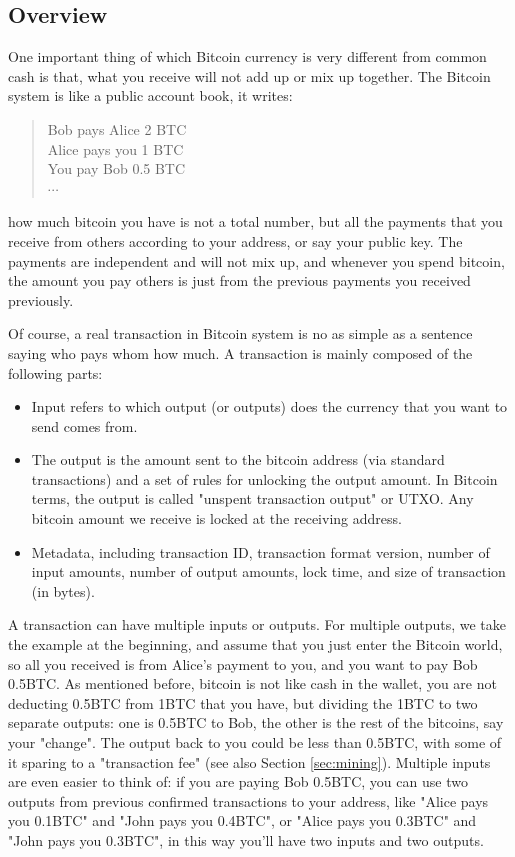 \documentclass[12pt,a4paper]{article}
\begin{document}
\subsection{Overview}
One important thing of which Bitcoin currency is very different from common cash is that, what you receive will not add up or mix up together. The Bitcoin system is like a public account book, it writes:
\begin{quote}
Bob pays Alice 2 BTC \\
Alice pays you 1 BTC\\
You pay Bob 0.5 BTC\\
$\cdots$
\end{quote}
how much bitcoin you have is not a total number, but all the payments that you receive from others according to your address, or say your public key. The payments are independent and will not mix up, and whenever you spend bitcoin, the amount you pay others is just from the previous payments you received previously. 

Of course, a real transaction in Bitcoin system is no as simple as a sentence saying who pays whom how much. A transaction is mainly composed of the following parts:
\begin{itemize}
	\item Input refers to which output (or outputs) does the currency that you want to send comes from.
	\item The output is the amount sent to the bitcoin address (via standard transactions) and a set of rules for unlocking the output amount. In Bitcoin terms, the output is called "unspent transaction output" or UTXO. Any bitcoin amount we receive is locked at the receiving address.
	\item Metadata, including transaction ID, transaction format version, number of input amounts, number of output amounts, lock time, and size of transaction (in bytes).
\end{itemize}

A transaction can have multiple inputs or outputs. For multiple outputs, we take the example at the beginning, and assume that you just enter the Bitcoin world, so all you received is from Alice's payment to you, and you want to pay Bob 0.5BTC. As mentioned before, bitcoin is not like cash in the wallet, you are not deducting 0.5BTC from 1BTC that you have, but dividing the 1BTC to two separate outputs: one is 0.5BTC to Bob, the other is the rest of the bitcoins, say your "change". The output back to you could be less than 0.5BTC, with some of it sparing to a "transaction fee" (see also Section \ref{sec:mining}). Multiple inputs are even easier to think of: if you are paying Bob 0.5BTC, you can use two outputs from previous confirmed transactions to your address, like "Alice pays you 0.1BTC" and "John pays you 0.4BTC", or "Alice pays you 0.3BTC" and "John pays you 0.3BTC", in this way you'll have two inputs and two outputs.
\end{document}
